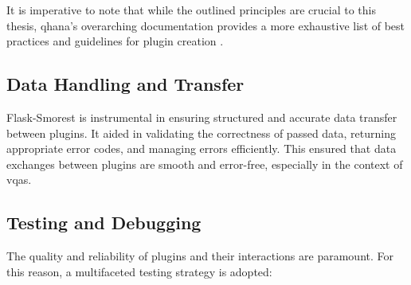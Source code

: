 \documentclass[
  a4paper,  %
  twoside,  %
  bibliography=totoc,
  headsepline,
  cleardoublepage=empty,
  parskip=half,
  draft=false
]{scrbook}
\begin{document}
It is imperative to note that while the outlined principles are crucial to this thesis, \gls{qhana}'s overarching documentation provides a more exhaustive list of best practices and guidelines for plugin creation \cite{FabianBuehler}.


\subsection{Data Handling and Transfer}
Flask-Smorest is instrumental in ensuring structured and accurate data transfer between plugins.
It aided in validating the correctness of passed data, returning appropriate error codes, and managing errors efficiently.
This ensured that data exchanges between plugins are smooth and error-free, especially in the context of \glspl{vqa}.

\subsection{Testing and Debugging}

The quality and reliability of plugins and their interactions are paramount.
For this reason, a multifaceted testing strategy is adopted:
\end{document}
